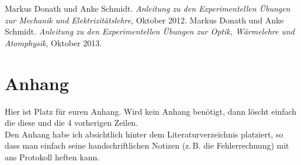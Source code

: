\documentclass[
    bibtotocnumbered,                                      %
    a4paper,                                               %
    oneside,                                               %
    12pt,                                                  %
    pagesize=auto                                          %
]{scrartcl}
\begin{document}
\newpage
\begin{thebibliography}{2} %
     Markus Donath und Anke Schmidt.
        \emph{Anleitung zu den Experimentellen Übungen zur Mechanik und Elektrizitätslehre}, Oktober 2012.
     Markus Donath und Anke Schmidt.
        \emph{Anleitung zu den Experimentellen Übungen zur Optik, Wärmelehre und Atomphysik}, Oktober 2013.
\end{thebibliography}
%
%


\newpage
\appendix
\section{Anhang}

Hier ist Platz für euren Anhang. Wird kein Anhang benötigt, dann löscht einfach die diese und die 4 vorherigen Zeilen.\\

Den Anhang habe ich absichtlich hinter dem Literaturverzeichnis platziert, so dass man einfach seine handschriftlichen Notizen (z.\,B. die Fehlerrechnung) mit ans Protokoll heften kann.

\end{document}
